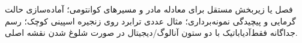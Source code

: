\begin{remark}
فصل یا زیربخش مستقل برای معادله مادر و مسیرهای کوانتومی؛ آماده‌سازی حالت گرمایی و پیچیدگی نمونه‌برداری؛ مثال عددی ترابرد روی زنجیره اسپینی کوچک؛ رسم جداگانه فقط‌آدیاباتیک با دو ستون آنالوگ/دیجیتال در صورت شلوغ شدن نقشه اصلی.
\end{remark}